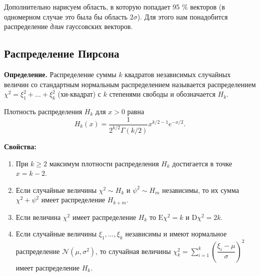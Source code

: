 \documentclass[11pt,a4paper]{article}
\providecommand{\tightlist}{%
      \setlength{\itemsep}{0pt}\setlength{\parskip}{0pt}}
\begin{document}
    \begin{center}
    \end{center}

    Дополнительно нарисуем область, в которую попадает 95 \% векторов (в
одномерном случае это была бы область \(2\sigma\)). Для этого нам
понадобится распределение \emph{длин} гауссовских векторов.

    \hypertarget{ux440ux430ux441ux43fux440ux435ux434ux435ux43bux435ux43dux438ux435-ux43fux438ux440ux441ux43eux43dux430}{%
\subsection{Распределение
Пирсона}\label{ux440ux430ux441ux43fux440ux435ux434ux435ux43bux435ux43dux438ux435-ux43fux438ux440ux441ux43eux43dux430}}

\textbf{Определение.} Распределение суммы \(k\) квадратов независимых
случайных величин со стандартным нормальным распределением называется
распределением \(\chi^2 = \xi_1^2 + \ldots + \xi_k^2\) (хи-квадрат) с
\(k\) степенями свободы и обозначается \(H_k\).

Плотность распределения \(H_k\) для \(x>0\) равна \[
  H_k(x) = \dfrac{1}{2^{k/2}\Gamma(k/2)} x^{k/2-1} e^{-x/2}.
\]

    \textbf{Свойства:}

\begin{enumerate}
\def\labelenumi{\arabic{enumi}.}
\tightlist
\item
  При \(k\ge2\) максимум плотности распределения \(H_k\) достигается в
  точке \(x=k-2\).
\item
  Если случайные величины \(\chi^2 \sim H_k\) и \(\psi^2 \sim H_m\)
  независимы, то их сумма \(\chi^2 + \psi^2\) имеет распределение
  \(H_{k+m}\).
\item
  Если величина \(\chi^2\) имеет распределение \(H_k\) то
  \(\mathrm{E} \chi^2 = k\) и \(\mathrm{D} \chi^2 = 2k\).
\item
  Если случайные величины \(\xi_1, \ldots, \xi_k\) независимы и имеют
  нормальное распределение \(\mathcal{N}(\mu, \sigma^2)\), то случайная
  величины
  \(\chi_k^2 = \sum\limits_{i=1}^{k} \left( \dfrac{\xi_i-\mu}{\sigma} \right)^2\)
  имеет распределение \(H_k\).
\end{enumerate}
\end{document}
